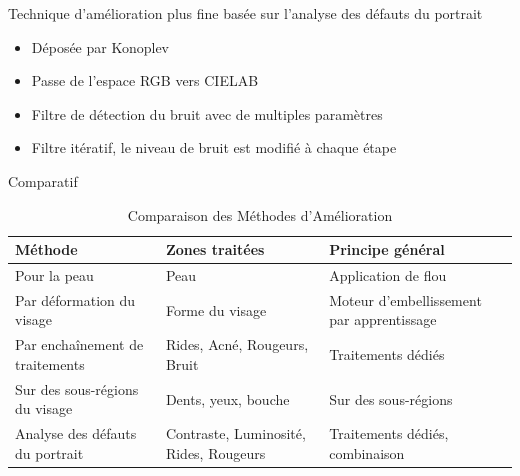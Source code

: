 \documentclass{beamer}
\begin{document}
\begin{frame}{Technique d’amélioration plus fine basée sur l’analyse des défauts du portrait}
\begin{itemize}
\item Déposée par Konoplev
\item Passe de l'espace RGB vers CIELAB
\item Filtre de détection du bruit avec de multiples paramètres
\item Filtre itératif, le niveau de bruit est modifié à chaque étape
\end{itemize}
\end{frame}


\begin{frame}{Comparatif}
\begin{table}
\caption{Comparaison des Méthodes d'Amélioration}
\begin{tabular}{|p{3cm}|p{3cm}|p{3.5cm}|}
\hline
Méthode & Zones traitées & Principe général \\ \hline
Pour la peau & Peau & Application de flou \\ \hline
Par déformation du visage & Forme du visage & Moteur d'embellissement par apprentissage \\ \hline
Par enchaînement de traitements & Rides, Acné, Rougeurs, Bruit & Traitements dédiés \\ \hline
Sur des sous-régions du visage & Dents, yeux, bouche & Sur des sous-régions  \\ \hline
Analyse des défauts du portrait & Contraste, Luminosité, Rides, Rougeurs & Traitements dédiés, combinaison \\ \hline
\end{tabular}
\label{ComparaisonMethodes}
\end{table}

\end{frame}
\end{document}
